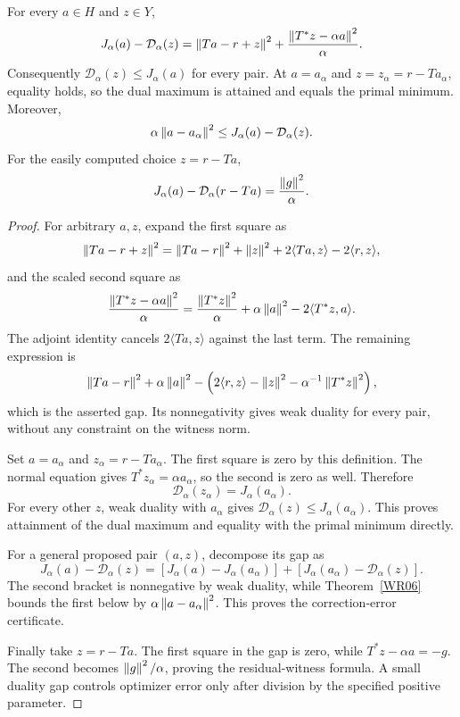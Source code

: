 \begin{theorem}\label{WR14}
For every $a\in H$ and $z\in Y$,
\begin{equation}\label{eq:regularized-duality-gap}
 J_\alpha(a)-\mathcal D_\alpha(z)
 =\left\lVert Ta-r+z\right\rVert^2+
   \frac{\left\lVert T^*z-\alpha a\right\rVert^2}{\alpha}.
\end{equation}
Consequently $\mathcal D_\alpha(z)\le J_\alpha(a)$ for every pair. At
$a=a_\alpha$ and $z=z_\alpha=r-Ta_\alpha$, equality holds, so the dual maximum is attained and equals the primal minimum. Moreover,
\[
 \alpha\left\lVert a-a_\alpha\right\rVert^2
 \le J_\alpha(a)-\mathcal D_\alpha(z).
\]
For the easily computed choice $z=r-Ta$,
\begin{equation}\label{eq:residual-dual-gap}
 J_\alpha(a)-\mathcal D_\alpha(r-Ta)=\frac{\left\lVert g\right\rVert^2}{\alpha}.
\end{equation}
\end{theorem}
\begin{proof}
For arbitrary $a,z$, expand the first square as
\[
 \left\lVert Ta-r+z\right\rVert^2
 =\left\lVert Ta-r\right\rVert^2+\left\lVert z\right\rVert^2+2\langle Ta,z\rangle-2\langle r,z\rangle,
\]
and the scaled second square as
\[
 \frac{\left\lVert T^*z-\alpha a\right\rVert^2}{\alpha}
 =\frac{\left\lVert T^*z\right\rVert^2}{\alpha}+\alpha\left\lVert a\right\rVert^2
       -2\langle T^*z,a\rangle.
\]
The adjoint identity cancels $2\langle Ta,z\rangle$ against the last term. The remaining expression is
\[
 \left\lVert Ta-r\right\rVert^2+\alpha\left\lVert a\right\rVert^2
 -\left(2\langle r,z\rangle-\left\lVert z\right\rVert^2
                    -\alpha^{-1}\left\lVert T^*z\right\rVert^2\right),
\]
which is the asserted gap. Its nonnegativity gives weak duality for every pair, without any constraint on the witness norm.

Set $a=a_\alpha$ and $z_\alpha=r-Ta_\alpha$. The first square is zero by this definition. The normal equation gives $T^*z_\alpha=\alpha a_\alpha$, so the second is zero as well. Therefore
\[
 \mathcal D_\alpha(z_\alpha)=J_\alpha(a_\alpha).
\]
For every other $z$, weak duality with $a_\alpha$ gives $\mathcal D_\alpha(z)\le J_\alpha(a_\alpha)$. This proves attainment of the dual maximum and equality with the primal minimum directly.

For a general proposed pair $(a,z)$, decompose its gap as
\[
 J_\alpha(a)-\mathcal D_\alpha(z)
 =[J_\alpha(a)-J_\alpha(a_\alpha)]
  +[J_\alpha(a_\alpha)-\mathcal D_\alpha(z)].
\]
The second bracket is nonnegative by weak duality, while Theorem~\ref{WR06} bounds the first below by $\alpha\left\lVert a-a_\alpha\right\rVert^2$. This proves the correction-error certificate.

Finally take $z=r-Ta$. The first square in the gap is zero, while $T^*z-\alpha a=-g$. The second becomes $\left\lVert g\right\rVert^2/\alpha$, proving the residual-witness formula. A small duality gap controls optimizer error only after division by the specified positive parameter.
\end{proof}

